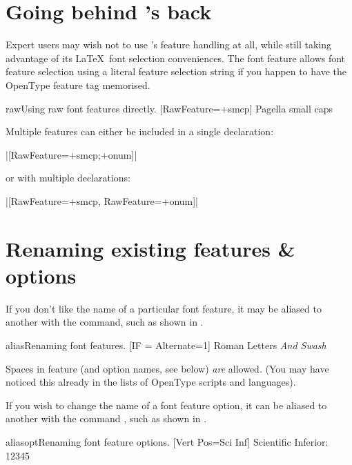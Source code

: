 \documentclass[a4paper]{l3doc}
\begin{document}
\section{Going behind 's back}
Expert users may wish not to use 's feature handling at all,
while still taking advantage of its \LaTeX\ font selection conveniences. The
 font feature allows font feature selection using a literal feature selection string if you happen to have the OpenType feature tag memorised.

\begin{Xexample}{raw}{Using raw font features directly.}
  [RawFeature=+smcp]
  Pagella small caps
\end{Xexample}

Multiple features can either be included in a single declaration:\par
{\centering|[RawFeature=+smcp;+onum]|\par}
\noindent or with multiple declarations:\par
{\centering|[RawFeature=+smcp, RawFeature=+onum]|\par}


\section{Renaming existing features \& options}
\label{sec:aliasfontfeature}

\DescribeMacro{\aliasfontfeature}
If you don't like the name of a particular font feature,
it may be aliased to another with the
 command,
such as shown in .

\begin{Xexample}{alias}{Renaming font features.}
  [IF = {Alternate=1}]
  Roman Letters \itshape And Swash
\end{Xexample}

Spaces in feature (and option names, see below) \emph{are} allowed. (You may have
noticed this already in the lists of OpenType scripts and languages).

\DescribeMacro{\aliasfontfeatureoption}
If you wish to change the name of a font feature option,
it can be aliased to another with the command
, such as shown in .

\begin{Lexample}{aliasopt}{Renaming font feature options.}
  [Vert Pos=Sci Inf]
   Scientific Inferior: 12345
\end{Lexample}
\end{document}
